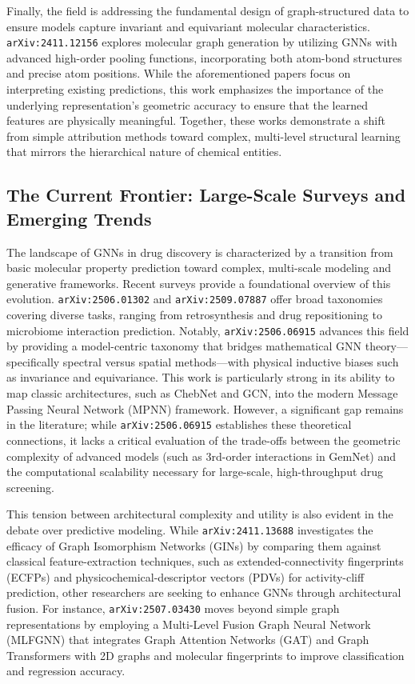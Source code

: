 \documentclass[11pt]{article}
\begin{document}
Finally, the field is addressing the fundamental design of graph-structured data to ensure models capture invariant and equivariant molecular characteristics. \texttt{arXiv:2411.12156} explores molecular graph generation by utilizing GNNs with advanced high-order pooling functions, incorporating both atom-bond structures and precise atom positions. While the aforementioned papers focus on interpreting existing predictions, this work emphasizes the importance of the underlying representation's geometric accuracy to ensure that the learned features are physically meaningful. Together, these works demonstrate a shift from simple attribution methods toward complex, multi-level structural learning that mirrors the hierarchical nature of chemical entities.

\subsection{The Current Frontier: Large-Scale Surveys and Emerging Trends}

The landscape of GNNs in drug discovery is characterized by a transition from basic molecular property prediction toward complex, multi-scale modeling and generative frameworks. Recent surveys provide a foundational overview of this evolution. \texttt{arXiv:2506.01302} and \texttt{arXiv:2509.07887} offer broad taxonomies covering diverse tasks, ranging from retrosynthesis and drug repositioning to microbiome interaction prediction. Notably, \texttt{arXiv:2506.06915} advances this field by providing a model-centric taxonomy that bridges mathematical GNN theory—specifically spectral versus spatial methods—with physical inductive biases such as invariance and equivariance. This work is particularly strong in its ability to map classic architectures, such as ChebNet and GCN, into the modern Message Passing Neural Network (MPNN) framework. However, a significant gap remains in the literature; while \texttt{arXiv:2506.06915} establishes these theoretical connections, it lacks a critical evaluation of the trade-offs between the geometric complexity of advanced models (such as 3rd-order interactions in GemNet) and the computational scalability necessary for large-scale, high-throughput drug screening.

This tension between architectural complexity and utility is also evident in the debate over predictive modeling. While \texttt{arXiv:2411.13688} investigates the efficacy of Graph Isomorphism Networks (GINs) by comparing them against classical feature-extraction techniques, such as extended-connectivity fingerprints (ECFPs) and physicochemical-descriptor vectors (PDVs) for activity-cliff prediction, other researchers are seeking to enhance GNNs through architectural fusion. For instance, \texttt{arXiv:2507.03430} moves beyond simple graph representations by employing a Multi-Level Fusion Graph Neural Network (MLFGNN) that integrates Graph Attention Networks (GAT) and Graph Transformers with 2D graphs and molecular fingerprints to improve classification and regression accuracy.
\end{document}
